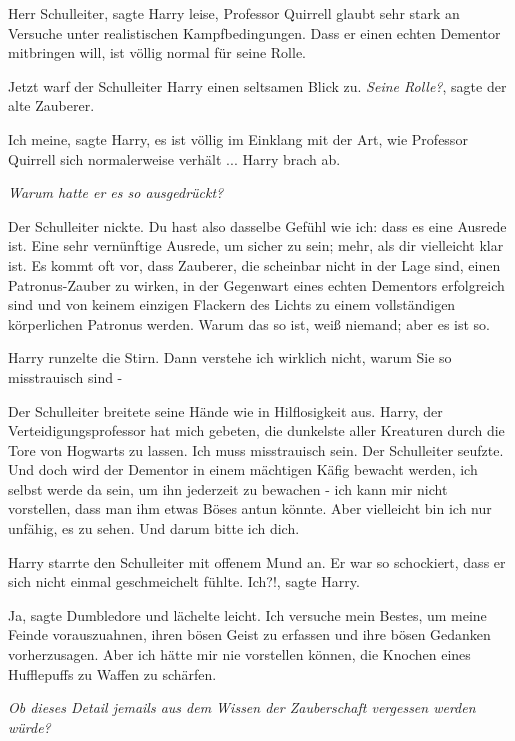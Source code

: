 \glqq{}Herr Schulleiter\grqq{}, sagte Harry leise, \glqq{}Professor Quirrell glaubt
sehr stark an Versuche unter realistischen Kampfbedingungen. Dass er einen
echten Dementor mitbringen will, ist völlig normal für seine Rolle.\grqq{}

Jetzt warf der Schulleiter Harry einen seltsamen Blick zu. \glqq{}\emph{Seine
Rolle?}\grqq{}, sagte der alte Zauberer.

\glqq{}Ich meine\grqq{}, sagte Harry, \glqq{}es ist völlig im Einklang mit der
Art, wie Professor Quirrell sich normalerweise verhält ...\grqq{} Harry brach ab.

\emph{Warum hatte er es so ausgedrückt?}

Der Schulleiter nickte. \glqq{}Du hast also dasselbe Gefühl wie ich: dass es eine
Ausrede ist. Eine sehr vernünftige Ausrede, um sicher zu sein; mehr, als dir
vielleicht klar ist. Es kommt oft vor, dass Zauberer, die scheinbar nicht in der
Lage sind, einen Patronus-Zauber zu wirken, in der Gegenwart eines echten
Dementors erfolgreich sind und von keinem einzigen Flackern des Lichts zu einem
vollständigen körperlichen Patronus werden. Warum das so ist, weiß niemand; aber
es ist so.\grqq{}

Harry runzelte die Stirn. \glqq{}Dann verstehe ich wirklich nicht, warum Sie so
misstrauisch sind -\grqq{}

Der Schulleiter breitete seine Hände wie in Hilflosigkeit aus. \glqq{}Harry, der
Verteidigungsprofessor hat mich gebeten, die dunkelste aller Kreaturen durch die
Tore von Hogwarts zu lassen. Ich muss misstrauisch sein.\grqq{} Der Schulleiter
seufzte. \glqq{}Und doch wird der Dementor in einem mächtigen Käfig bewacht
werden, ich selbst werde da sein, um ihn jederzeit zu bewachen - ich kann mir
nicht vorstellen, dass man ihm etwas Böses antun könnte. Aber vielleicht bin ich
nur unfähig, es zu sehen. Und darum bitte ich dich.\grqq{}

Harry starrte den Schulleiter mit offenem Mund an. Er war so schockiert, dass er
sich nicht einmal geschmeichelt fühlte. \glqq{}Ich?!\grqq{}, sagte Harry.

\glqq{}Ja\grqq{}, sagte Dumbledore und lächelte leicht. \glqq{}Ich versuche mein
Bestes, um meine Feinde vorauszuahnen, ihren bösen Geist zu erfassen und ihre
bösen Gedanken vorherzusagen. Aber ich hätte mir nie vorstellen können, die
Knochen eines Hufflepuffs zu Waffen zu schärfen.\grqq{}

\emph{Ob dieses Detail jemails aus dem Wissen der Zauberschaft vergessen werden
würde?}

